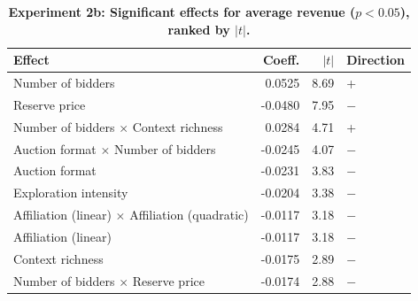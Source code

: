 \begin{table}[H]
\centering
\caption[Experiment 2b: Significant effects for average revenue ($p < 0.05$), ranked by $|t|$]{\textbf{Experiment 2b: Significant effects for average revenue ($p < 0.05$), ranked by $|t|$.}}
\label{tab:exp2b_ranked_rev}
\begin{tabular}{lrrl}
\toprule
\textbf{Effect} & \textbf{Coeff.} & \textbf{$|t|$} & \textbf{Direction} \\
\midrule
Number of bidders & 0.0525 & 8.69 & + \\
Reserve price & -0.0480 & 7.95 & $-$ \\
Number of bidders $\times$ Context richness & 0.0284 & 4.71 & + \\
Auction format $\times$ Number of bidders & -0.0245 & 4.07 & $-$ \\
Auction format & -0.0231 & 3.83 & $-$ \\
Exploration intensity & -0.0204 & 3.38 & $-$ \\
Affiliation (linear) $\times$ Affiliation (quadratic) & -0.0117 & 3.18 & $-$ \\
Affiliation (linear) & -0.0117 & 3.18 & $-$ \\
Context richness & -0.0175 & 2.89 & $-$ \\
Number of bidders $\times$ Reserve price & -0.0174 & 2.88 & $-$ \\
\bottomrule
\end{tabular}
\end{table}

